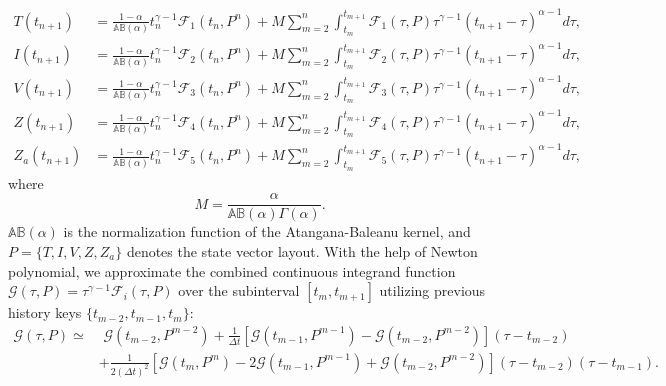 \documentclass{article}
\theoremstyle{plain}
\theoremstyle{definition}
\numberwithin{equation}{section}
\begin{document}
\begin{equation}
\begin{aligned}
T(t_{n+1}) &= \frac{1-\alpha}{\mathbb{AB}(\alpha)} t_n^{\gamma-1} \mathcal{F}_1(t_n, P^n) + M \sum_{m=2}^{n} \int_{t_m}^{t_{m+1}} \mathcal{F}_1(\tau, P) \tau^{\gamma-1} (t_{n+1} - \tau)^{\alpha-1} d\tau, \\[6pt]
I(t_{n+1}) &= \frac{1-\alpha}{\mathbb{AB}(\alpha)} t_n^{\gamma-1} \mathcal{F}_2(t_n, P^n) + M \sum_{m=2}^{n} \int_{t_m}^{t_{m+1}} \mathcal{F}_2(\tau, P) \tau^{\gamma-1} (t_{n+1} - \tau)^{\alpha-1} d\tau, \\[6pt]
V(t_{n+1}) &= \frac{1-\alpha}{\mathbb{AB}(\alpha)} t_n^{\gamma-1} \mathcal{F}_3(t_n, P^n) + M \sum_{m=2}^{n} \int_{t_m}^{t_{m+1}} \mathcal{F}_3(\tau, P) \tau^{\gamma-1} (t_{n+1} - \tau)^{\alpha-1} d\tau, \\[6pt]
Z(t_{n+1}) &= \frac{1-\alpha}{\mathbb{AB}(\alpha)} t_n^{\gamma-1} \mathcal{F}_4(t_n, P^n) + M \sum_{m=2}^{n} \int_{t_m}^{t_{m+1}} \mathcal{F}_4(\tau, P) \tau^{\gamma-1} (t_{n+1} - \tau)^{\alpha-1} d\tau, \\[6pt]
Z_a(t_{n+1}) &= \frac{1-\alpha}{\mathbb{AB}(\alpha)} t_n^{\gamma-1} \mathcal{F}_5(t_n, P^n) + M \sum_{m=2}^{n} \int_{t_m}^{t_{m+1}} \mathcal{F}_5(\tau, P) \tau^{\gamma-1} (t_{n+1} - \tau)^{\alpha-1} d\tau,
\end{aligned}
\end{equation}
where
\begin{equation*}
    M = \frac{\alpha}{\mathbb{AB}(\alpha)\Gamma(\alpha)}.
\end{equation*}
$\mathbb{AB}(\alpha)$ is the normalization function of the Atangana-Baleanu kernel, and $P = \{T, I, V, Z, Z_a\}$ denotes the state vector layout. With the help of Newton polynomial, we approximate the combined continuous integrand function $\mathcal{G}(\tau, P) = \tau^{\gamma-1}\mathcal{F}_i(\tau, P)$ over the subinterval $[t_m, t_{m+1}]$ utilizing previous history keys $\{t_{m-2}, t_{m-1}, t_m\}$:
\begin{equation}
\begin{aligned}
\mathcal{G}(\tau, P) \simeq & \,\, \mathcal{G}(t_{m-2}, P^{m-2}) + \frac{1}{\Delta t} \left[ \mathcal{G}(t_{m-1}, P^{m-1}) - \mathcal{G}(t_{m-2}, P^{m-2}) \right] (\tau - t_{m-2}) \\
& + \frac{1}{2(\Delta t)^2} \left[ \mathcal{G}(t_m, P^m) - 2\mathcal{G}(t_{m-1}, P^{m-1}) + \mathcal{G}(t_{m-2}, P^{m-2}) \right] (\tau - t_{m-2})(\tau - t_{m-1}).
\end{aligned}
\end{equation}
\end{document}
